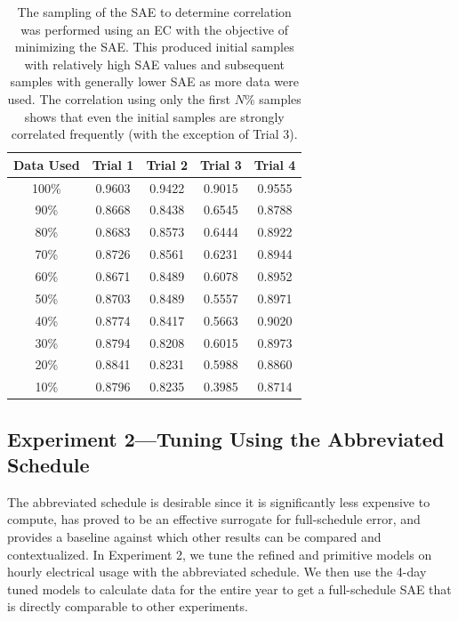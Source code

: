 \documentclass[preprint, review, 12pt]{elsarticle}
\begin{document}
\begin{table}[htbp]
\centering
\caption{The sampling of the SAE to determine correlation was performed using an EC with the objective of minimizing the SAE. This produced initial samples with relatively high SAE values and subsequent samples with generally lower SAE as more data were used. The correlation using only the first $N$\% samples shows that even the initial samples are strongly correlated frequently (with the exception of Trial 3).}
\label{tab:hour-corr}
\begin{tabular}{ccccc}
\toprule
Data Used & Trial 1 & Trial 2 & Trial 3 & Trial 4\\
\midrule
100\% & 0.9603 & 0.9422 & 0.9015 & 0.9555\\\rowcolor{DarkRow}
90\%  & 0.8668 & 0.8438 & 0.6545 & 0.8788\\
80\%  & 0.8683 & 0.8573 & 0.6444 & 0.8922\\\rowcolor{DarkRow}
70\%  & 0.8726 & 0.8561 & 0.6231 & 0.8944\\
60\%  & 0.8671 & 0.8489 & 0.6078 & 0.8952\\\rowcolor{DarkRow}
50\%  & 0.8703 & 0.8489 & 0.5557 & 0.8971\\
40\%  & 0.8774 & 0.8417 & 0.5663 & 0.9020\\\rowcolor{DarkRow}
30\%  & 0.8794 & 0.8208 & 0.6015 & 0.8973\\
20\%  & 0.8841 & 0.8231 & 0.5988 & 0.8860\\\rowcolor{DarkRow}
10\%  & 0.8796 & 0.8235 & 0.3985 & 0.8714\\
\bottomrule
\end{tabular}
\end{table}


\subsection{Experiment 2---Tuning Using the Abbreviated Schedule}
\label{sub:experiment2}
The abbreviated schedule is desirable since it is significantly less expensive to compute, has proved to be an effective surrogate for full-schedule error, and provides a baseline against which other results can be compared and contextualized. In Experiment 2, we tune the refined and primitive models on hourly electrical usage with the abbreviated schedule. We then use the 4-day tuned models to calculate data for the entire year to get a full-schedule SAE that is directly comparable to other experiments. %
\end{document}
